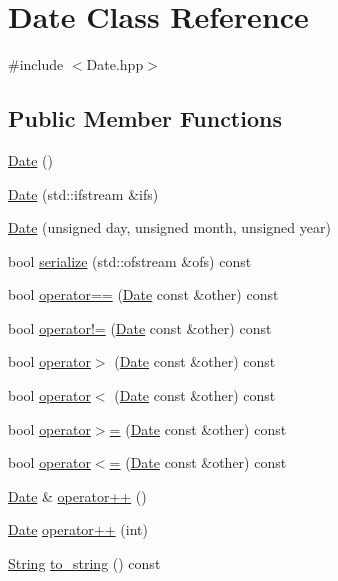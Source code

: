 \hypertarget{classDate}{}\section{Date Class Reference}
\label{classDate}


{\ttfamily \#include $<$Date.\+hpp$>$}

\subsection*{Public Member Functions}
\begin{DoxyCompactItemize}
\item 
\hyperlink{classDate_a4e59ed4ba66eec61c27460c5d09fa1bd}{Date} ()
\item 
\hyperlink{classDate_a5e72c9e6a4e666e260e989c2fd16beaf}{Date} (std\+::ifstream \&ifs)
\item 
\hyperlink{classDate_a6e4979dfc71c09cdab0b65a734e4a4df}{Date} (unsigned day, unsigned month, unsigned year)
\item 
bool \hyperlink{classDate_aaa7c624e382fff1ba3438cb46232c05e}{serialize} (std\+::ofstream \&ofs) const
\item 
bool \hyperlink{classDate_a0b4650e6e69f6ab4816ee480b0ae2737}{operator==} (\hyperlink{classDate}{Date} const \&other) const
\item 
bool \hyperlink{classDate_a8b7030515e10d7d79f187165463a3315}{operator!=} (\hyperlink{classDate}{Date} const \&other) const
\item 
bool \hyperlink{classDate_a52d36d1aa6868b5afa178bd495714e44}{operator$>$} (\hyperlink{classDate}{Date} const \&other) const
\item 
bool \hyperlink{classDate_a074316aeb377c6c1ea828b2642b39153}{operator$<$} (\hyperlink{classDate}{Date} const \&other) const
\item 
bool \hyperlink{classDate_ac1bca91434bf336beb5372ee4a2ca46f}{operator$>$=} (\hyperlink{classDate}{Date} const \&other) const
\item 
bool \hyperlink{classDate_a01c66a5f355ed676a1ee8effb78af222}{operator$<$=} (\hyperlink{classDate}{Date} const \&other) const
\item 
\hyperlink{classDate}{Date} \& \hyperlink{classDate_a3993e645e3408e07d12b70e58f36630c}{operator++} ()
\item 
\hyperlink{classDate}{Date} \hyperlink{classDate_a63f7060a7a7997e289e5e885f84557e5}{operator++} (int)
\item 
\hyperlink{classString}{String} \hyperlink{classDate_a4d4dfda9dfa34c87e06381254bfe5151}{to\+\_\+string} () const
\end{DoxyCompactItemize}
